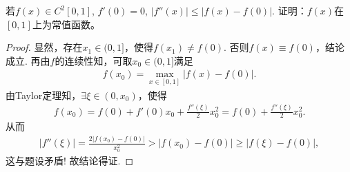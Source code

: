 \documentclass[../../main.tex]{subfiles}%
\begin{document}
\begin{example}
若$f(x)\in C^2[0,1]$, $f'(0)=0$, $|f''(x)|\leqslant |f(x)-f(0)|$. 证明：$f(x)$在$[0,1]$上为常值函数。
\end{example}
\begin{proof}
显然，存在$x_1\in(0,1]$，使得$f(x_1)\ne f(0)$. 否则$f(x)\equiv f(0)$，结论成立. 再由$f$的连续性知，可取$x_0\in(0,1]$满足
\begin{align*}
f(x_0)=\max\limits_{x\in[0,1]}|f(x)-f(0)|.
\end{align*}
由Taylor定理知，$\exists \xi\in(0,x_0)$，使得
\begin{align*}
f(x_0)=f(0)+f'(0)x_0+\frac{f''(\xi)}{2}x_0^2
=f(0)+\frac{f''(\xi)}{2}x_0^2.
\end{align*}
从而
\begin{align*}
|f''(\xi)|=\frac{2|f(x_0)-f(0)|}{x_0^2}
>|f(x_0)-f(0)|\geqslant |f(\xi)-f(0)|,
\end{align*}
这与题设矛盾! 故结论得证.
\end{proof}
\end{document}
